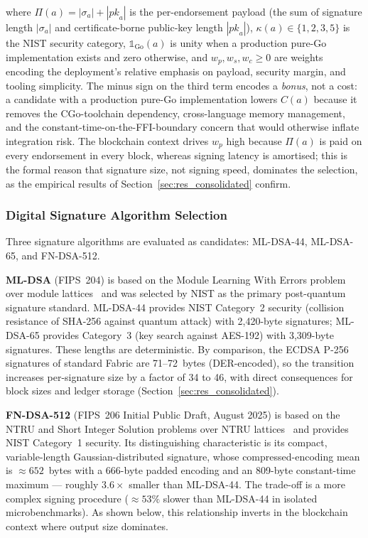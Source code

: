 \documentclass{ieeetj}
\begin{document}
where $\Pi(a)=|\sigma_a|+|\mathit{pk}_a|$ is the per-endorsement payload (the
sum of signature length $|\sigma_a|$ and certificate-borne public-key length
$|\mathit{pk}_a|$), $\kappa(a)\in\{1,2,3,5\}$ is the NIST security category,
$\mathbb{1}_{\mathrm{Go}}(a)$ is unity when a production pure-Go implementation
exists and zero otherwise, and $w_p,w_s,w_c\ge 0$ are weights encoding the
deployment's relative emphasis on payload, security margin, and tooling
simplicity. The minus sign on the third term encodes a \emph{bonus}, not a
cost: a candidate with a production pure-Go implementation lowers $C(a)$
because it removes the CGo-toolchain dependency, cross-language memory
management, and the constant-time-on-the-FFI-boundary concern that would
otherwise inflate integration risk. The blockchain context drives $w_p$
high because $\Pi(a)$ is paid on every endorsement in every block, whereas
signing latency is amortised; this is the formal reason that signature
size, not signing speed, dominates the selection, as the empirical results
of Section~\ref{sec:res_consolidated} confirm.

\subsubsection{Digital Signature Algorithm Selection}

Three signature algorithms are evaluated as candidates: ML-DSA-44, ML-DSA-65,
and FN-DSA-512.

\textbf{ML-DSA} (FIPS~204) is based on the Module Learning With Errors problem
over module lattices~\cite{ducas2018dilithium} and was selected by NIST as the
primary post-quantum signature standard. ML-DSA-44 provides NIST Category~2
security (collision resistance of SHA-256 against quantum attack) with
2{,}420-byte signatures; ML-DSA-65 provides Category~3 (key search against
AES-192) with 3{,}309-byte signatures. These lengths are deterministic. By
comparison, the ECDSA P-256 signatures of standard Fabric are 71--72~bytes
(DER-encoded), so the transition increases per-signature size by a factor of 34
to 46, with direct consequences for block sizes and ledger storage
(Section~\ref{sec:res_consolidated}).

\textbf{FN-DSA-512} (FIPS~206 Initial Public Draft, August 2025) is based on the
NTRU and Short Integer Solution problems over NTRU
lattices~\cite{pornin2019, prest2020falcon} and provides NIST Category~1
security. Its distinguishing characteristic is its compact, variable-length
Gaussian-distributed signature, whose compressed-encoding mean is
$\approx652$~bytes with a 666-byte padded encoding and an 809-byte constant-time
maximum --- roughly $3.6\times$ smaller than ML-DSA-44. The trade-off is a more
complex signing procedure ($\approx53\%$ slower than ML-DSA-44 in isolated
microbenchmarks). As shown below, this relationship inverts in the blockchain
context where output size dominates.
\end{document}
